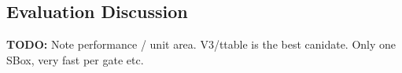 
\subsection{Evaluation Discussion}
\label{sec:eval:results}

{\bf TODO:}
Note performance / unit area.
V3/ttable is the best canidate. Only one SBox, very fast per gate etc.
